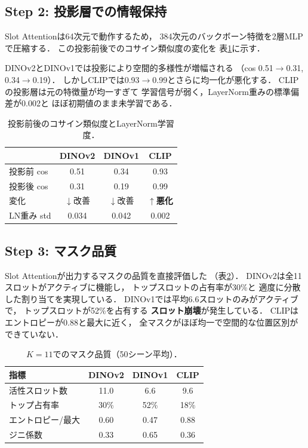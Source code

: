\documentclass[dvipdfmx,twocolumn]{jarticle}
\begin{document}
\subsection{Step 2: 投影層での情報保持}

Slot Attentionは64次元で動作するため，
384次元のバックボーン特徴を2層MLPで圧縮する．
この投影前後でのコサイン類似度の変化を
表\ref{tab:projection_analysis}に示す．

DINOv2とDINOv1では投影により空間的多様性が増幅される
（cos 0.51$\to$0.31, 0.34$\to$0.19）．
しかしCLIPでは0.93$\to$0.99とさらに均一化が悪化する．
CLIPの投影層は元の特徴量が均一すぎて
学習信号が弱く，LayerNorm重みの標準偏差が0.002と
ほぼ初期値のまま未学習である．

\begin{table}[t]
\centering
\caption{投影前後のコサイン類似度とLayerNorm学習度．}
\label{tab:projection_analysis}
\small
\begin{tabular}{lccc}
\toprule
 & DINOv2 & DINOv1 & CLIP \\
\midrule
投影前 cos & 0.51 & 0.34 & 0.93 \\
投影後 cos & 0.31 & 0.19 & 0.99 \\
変化 & $\downarrow$改善 & $\downarrow$改善 & $\uparrow$\textbf{悪化} \\
LN重み std & 0.034 & 0.042 & 0.002 \\
\bottomrule
\end{tabular}
\end{table}

\subsection{Step 3: マスク品質}

Slot Attentionが出力するマスクの品質を直接評価した
（表\ref{tab:mask_quality}）．
DINOv2は全11スロットがアクティブに機能し，
トップスロットの占有率が30\%と
適度に分散した割り当てを実現している．
DINOv1では平均6.6スロットのみがアクティブで，
トップスロットが52\%を占有する
\textbf{スロット崩壊}が発生している．
CLIPはエントロピーが0.88と最大に近く，
全マスクがほぼ均一で空間的な位置区別ができていない．

\begin{table}[t]
\centering
\caption{$K{=}11$でのマスク品質（50シーン平均）．}
\label{tab:mask_quality}
\small
\begin{tabular}{lccc}
\toprule
指標 & DINOv2 & DINOv1 & CLIP \\
\midrule
活性スロット数 & 11.0 & 6.6 & 9.6 \\
トップ占有率 & 30\% & 52\% & 18\% \\
エントロピー/最大 & 0.60 & 0.47 & 0.88 \\
ジニ係数 & 0.33 & 0.65 & 0.36 \\
\bottomrule
\end{tabular}
\end{table}
\end{document}
